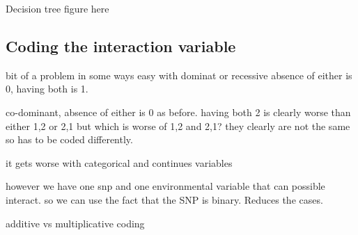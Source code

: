 \documentclass[10pt,a4paper]{report}
\begin{document}
Decision tree figure here

\subsection{Coding the interaction variable}
bit of a problem in some ways
easy with dominat or recessive
absence of either is 0, having both is 1.

co-dominant, absence of either is 0 as before. having both 2 is clearly worse than either 1,2 or 2,1
but which is worse of 1,2 and 2,1? they clearly are not the same so has to be coded differently.

it gets worse with categorical and continues variables

however we have one snp and one environmental variable that can possible interact. so we can use the fact that the SNP is binary. Reduces the cases.

additive vs multiplicative coding

\clearpage
\end{document}
